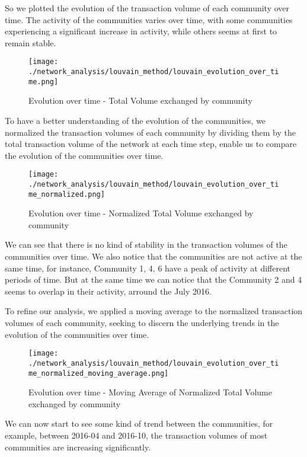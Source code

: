 \documentclass[a4paper, 12pt]{article}
\begin{document}
So we plotted the evolution of the transaction volume of each community over time.
The activity of the communities varies over time, with some communities experiencing a significant increase in activity, while others seems at first to remain stable. 

\begin{figure}[h]
    \centering
    \texttt{[image: ./network\_analysis/louvain\_method/louvain\_evolution\_over\_time.png]}
    \caption{Evolution over time - Total Volume exchanged by community}
    \label{fig:louvain_evolution_over_time}
\end{figure}

To have a better understanding of the evolution of the communities, we normalized the transaction volumes of each community by dividing them by the total transaction volume of the network at each time step, enable us to compare the evolution of the communities over time.

\begin{figure}[h]
    \centering
    \texttt{[image: ./network\_analysis/louvain\_method/louvain\_evolution\_over\_time\_normalized.png]}
    \caption{Evolution over time - Normalized Total Volume exchanged by community}
    \label{fig:enter-label}
\end{figure}

We can see that there is no kind of stability in the transaction volumes of the communities over time. We also notice that the communities are 
not active at the same time, for instance, Community 1, 4, 6 have a peak of activity at different periods of time.
But at the same time we can notice that the Community 2 and 4 seems to overlap in their activity, arround the July 2016.

To refine our analysis, we applied a moving average to the normalized transaction volumes of each community, 
seeking to discern the underlying trends in the evolution of the communities over time.

\begin{figure}[h]
    \centering
    \texttt{[image: ./network\_analysis/louvain\_method/louvain\_evolution\_over\_time\_normalized\_moving\_average.png]}
    \caption{Evolution over time - Moving Average of Normalized Total Volume exchanged by community}
    \label{fig:enter-label}
\end{figure}

We can now start to see some kind of trend between the communities, for example, between 2016-04 and 2016-10, the transaction volumes
of most communities are increasing significantly.
\end{document}
